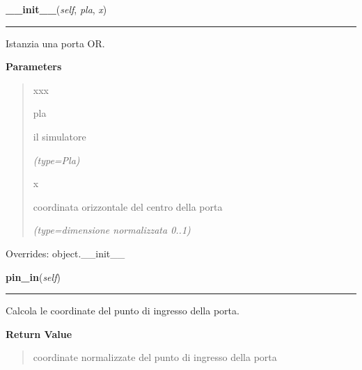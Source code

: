     \vspace{0.5ex}

\hspace{.8\funcindent}\begin{boxedminipage}{\funcwidth}

    \raggedright \textbf{\_\_init\_\_}(\textit{self}, \textit{pla}, \textit{x})

    \vspace{-1.5ex}

    \rule{\textwidth}{0.5\fboxrule}
\setlength{\parskip}{2ex}
    Istanzia una porta OR.

\setlength{\parskip}{1ex}
      \textbf{Parameters}
      \vspace{-1ex}

      \begin{quote}
        \begin{Ventry}{xxx}

          \item[pla]

          il simulatore

            {\it (type=Pla)}

          \item[x]

          coordinata orizzontale del centro della porta

            {\it (type=dimensione normalizzata 0..1)}

        \end{Ventry}

      \end{quote}

      Overrides: object.\_\_init\_\_

    \end{boxedminipage}

    \label{component:Or:pin_in}

    \vspace{0.5ex}

\hspace{.8\funcindent}\begin{boxedminipage}{\funcwidth}

    \raggedright \textbf{pin\_in}(\textit{self})

    \vspace{-1.5ex}

    \rule{\textwidth}{0.5\fboxrule}
\setlength{\parskip}{2ex}
    Calcola le coordinate del punto di ingresso della porta.

\setlength{\parskip}{1ex}
      \textbf{Return Value}
    \vspace{-1ex}

      \begin{quote}
      coordinate normalizzate del punto di ingresso della porta

      \end{quote}

    \end{boxedminipage}

